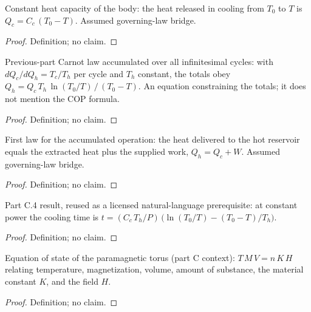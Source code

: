\begin{definition}
\label{def:IPhO2026Problems_problem_IPhO_2026_3_C_5:CooledBodyHeatBalance}
Constant heat capacity of the body: the heat released in cooling from $T_0$
to $T$ is $Q_c = C_c\,(T_0 - T)$. Assumed governing-law bridge.
\end{definition}
\begin{proof}
Definition; no claim.
\end{proof}

\begin{definition}
\label{def:IPhO2026Problems_problem_IPhO_2026_3_C_5:AccumulatedCarnotHeatRelation}
Previous-part Carnot law accumulated over all infinitesimal cycles: with
$dQ_c/dQ_h = T_c/T_h$ per cycle and $T_h$ constant, the totals obey
$Q_h = Q_c\,T_h\,\ln(T_0/T)\,/\,(T_0 - T)$. An equation constraining the
totals; it does not mention the COP formula.
\end{definition}
\begin{proof}
Definition; no claim.
\end{proof}

\begin{definition}
\label{def:IPhO2026Problems_problem_IPhO_2026_3_C_5:RefrigeratorEnergyBalance}
First law for the accumulated operation: the heat delivered to the hot
reservoir equals the extracted heat plus the supplied work,
$Q_h = Q_c + W$. Assumed governing-law bridge.
\end{definition}
\begin{proof}
Definition; no claim.
\end{proof}

\begin{definition}
\label{def:IPhO2026Problems_problem_IPhO_2026_3_C_5:C4ElapsedTimeLaw}
Part C.4 result, reused as a licensed natural-language prerequisite: at
constant power the cooling time is
$t = (C_c\,T_h/P)\,\bigl(\ln(T_0/T) - (T_0 - T)/T_h\bigr)$.
\end{definition}
\begin{proof}
Definition; no claim.
\end{proof}

\begin{definition}
\label{def:IPhO2026Problems_problem_IPhO_2026_3_C_5:ParamagneticEquationOfState}
Equation of state of the paramagnetic torus (part C context):
$T\,M\,V = n\,K\,H$ relating temperature, magnetization, volume, amount of
substance, the material constant $K$, and the field $H$.
\end{definition}
\begin{proof}
Definition; no claim.
\end{proof}

